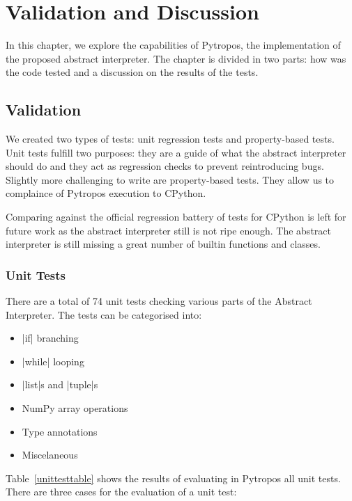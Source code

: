 \chapter{Validation and Discussion}\label{validation-and-discussion}

In this chapter, we explore the capabilities of Pytropos, the implementation of the
proposed abstract interpreter. The chapter is divided in two parts: how was the code
tested and a discussion on the results of the tests.

\section{Validation}\label{validation}

We created two types of tests: unit regression tests and property-based tests. Unit tests
fulfill two purposes: they are a guide of what the abstract interpreter should do and they
act as regression checks to prevent reintroducing bugs. Slightly more challenging to
write are property-based tests. They allow us to complaince of Pytropos execution to
CPython.

Comparing against the official regression battery of tests for CPython is left for future
work as the abstract interpreter still is not ripe enough. The abstract interpreter is
still missing a great number of builtin functions and classes.

\subsection{Unit Tests}\label{unit-tests}

There are a total of 74 unit tests checking various parts of the Abstract Interpreter. The
tests can be categorised into:

\begin{itemize}
\tightlist
\item \pycode|if| branching
\item \pycode|while| looping
\item \pycode|list|s and \pycode|tuple|s
\item NumPy array operations
\item Type annotations
\item Miscelaneous
\end{itemize}

Table~\ref{unittesttable} shows the results of evaluating in Pytropos all unit tests.
There are three cases for the evaluation of a unit test:

